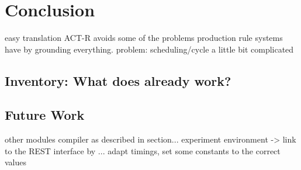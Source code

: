 \chapter{Conclusion}

easy translation
ACT-R avoids some of the problems production rule systems have by grounding everything.
problem: scheduling/cycle a little bit complicated



\section{Inventory: What does already work?}

\section{Future Work}

other modules
compiler as described in section...
experiment environment -> link to the REST interface by ...
adapt timings, set some constants to the correct values
